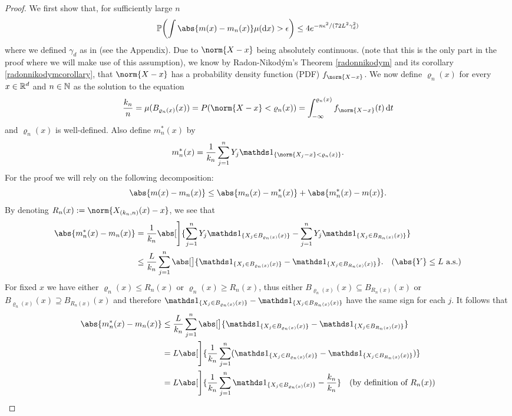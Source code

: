 \begin{proof}
    We first show that, for sufficiently large \(n\)
    \[
        \pro{\int \abs{m(x) - m_n(x)} \mu(\dx) > \epsilon}
        \leq 4e^{-n\epsilon^2 / (72 L^2 \gamma^2_d)}
    \]
    where we defined \(\gamma_d\) as in  (see the Appendix). Due to \(\norm{X - x}\) being absolutely continuous. (note that this is the only part in the proof where we will make use of this assumption), we know by Radon-Nikodým's Theorem \ref{radonnikodym} and its corollary \ref{radonnikodymcorollary}, that \(\norm{X - x}\) has a probability density function (PDF) \(f_{\norm{X - x}}\). We now define \(\varrho_n(x)\) for every \(x \in \mathbb{R}^d\) and \(n \in \mathbb{N}\) as the solution to the equation
    \[
        \frac{k_n}{n} = \mu(B_{\varrho_n(x)}(x)) = P(\norm{X - x} < \varrho_n(x)) = \int_{-\infty}^{\varrho_n(x)} f_{\norm{X - x}}(t) \dt
    \]
    and \(\varrho_n(x)\) is well-defined.
    Also define \(m_n^*(x)\) by
    \[
        m_n^*(x) = \frac{1}{k_n}\sum_{j=1}^n Y_j \ind{\{\norm{X_j - x} < \varrho_n(x)\}}.
    \]
    For the proof we will rely on the following decomposition:
    \[
        \abs{m(x) - m_n(x)} \leq \abs{m_n(x) - m_n^*(x)} + \abs{m_n^*(x) - m(x)}.
    \]
    By denoting \(R_n(x) := \norm{X_{(k_n, n)}(x) - x}\), we see that
    \begin{align*}
        \abs{m_n^*(x) - m_n(x)}
        &= \frac{1}{k_n}\abs[\Bigg]{\sum_{j=1}^n Y_j \ind{\{X_j \in B_{\varrho_n(x)}(x)\}} - \sum_{j=1}^n Y_j \ind{\{X_j \in B_{R_n(x)}(x)\}}} \\
        &\leq \frac{L}{k_n} \sum_{j=1}^n\abs[\big]{ \ind{\{X_j \in B_{\varrho_n(x)}(x)\}} - \ind{\{X_j \in B_{R_n(x)}(x)\}}}. \quad (\abs{Y} \leq L \ \text{a.s.})
    \end{align*}
    For fixed \(x\) we have either \(\varrho_n(x) \leq R_n(x)\) or \(\varrho_n(x) \geq R_n(x)\), thus either \(B_{\varrho_n(x)}(x) \subseteq B_{R_n(x)}(x)\) or \(B_{\varrho_n(x)}(x) \supseteq B_{R_n(x)}(x)\) and therefore
    \(\ind{\{X_j \in B_{\varrho_n(x)}(x)\}} - \ind{\{X_j \in B_{R_n(x)}(x)\}}\) have the same sign for each \(j\). It follows that
    \begin{align*}
        \abs{m_n^*(x) - m_n(x)}
        &\leq \frac{L}{k_n} \sum_{j=1}^n\abs[\big]{ \ind{\{X_j \in B_{\varrho_n(x)}(x)\}} - \ind{\{X_j \in B_{R_n(x)}(x)\}}} \\
        &= L \abs[\Bigg]{\frac{1}{k_n} \sum_{j=1}^n (\ind{\{X_j \in B_{\varrho_n(x)}(x)\}} - \ind{\{X_j \in B_{R_n(x)}(x)\}})} \\
        &= L \abs[\Bigg]{\frac{1}{k_n} \sum_{j=1}^n \ind{\{X_j \in B_{\varrho_n(x)}(x)\}} - \frac{k_n}{k_n}} \quad \text{(by definition of \(R_n(x)\))}\\

\end{align*}
\end{proof}
